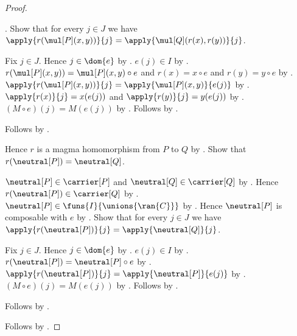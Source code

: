 \begin{proof}
\begin{subproof}
            .
        Show that for every $j\in J$ we have
            $\apply{r(\mul[P](x,y))}{j}
                =\apply{\mul[Q](r(x),r(y))}{j}$.
        \begin{subproof}
            Fix $j\in J$.
            Hence $j\in\dom{e}$ by .
            $e(j)\in I$ by .
            $r(\mul[P](x,y))=\mul[P](x,y)\circ e$ and
                $r(x)=x\circ e$ and $r(y)=y\circ e$ by
                .
            $\apply{r(\mul[P](x,y))}{j}
                =\apply{\mul[P](x,y)}{e(j)}$ by
                .
            $\apply{r(x)}{j}=x(e(j))$ and
                $\apply{r(y)}{j}=y(e(j))$ by
                .
            $(M\circ e)(j)=M(e(j))$ by
                .
            Follows by .
        \end{subproof}
        Follows by
            .
    \end{subproof}
    Hence $r$ is a magma homomorphism from $P$ to $Q$ by
        .
    Show that $r(\neutral[P])=\neutral[Q]$.
    \begin{subproof}
        $\neutral[P]\in\carrier[P]$ and
            $\neutral[Q]\in\carrier[Q]$ by
            .
        Hence $r(\neutral[P])\in\carrier[Q]$ by
            .
        $\neutral[P]\in\funs{I}{\unions{\ran{C}}}$ by
            .
        Hence $\neutral[P]$ is composable with $e$ by
            .
        Show that for every $j\in J$ we have
            $\apply{r(\neutral[P])}{j}=\apply{\neutral[Q]}{j}$.
        \begin{subproof}
            Fix $j\in J$.
            Hence $j\in\dom{e}$ by .
            $e(j)\in I$ by .
            $r(\neutral[P])=\neutral[P]\circ e$ by
                .
            $\apply{r(\neutral[P])}{j}
                =\apply{\neutral[P]}{e(j)}$ by
                .
            $(M\circ e)(j)=M(e(j))$ by
                .
            Follows by
                .
        \end{subproof}
        Follows by
            .
    \end{subproof}
    Follows by .
\end{proof}

